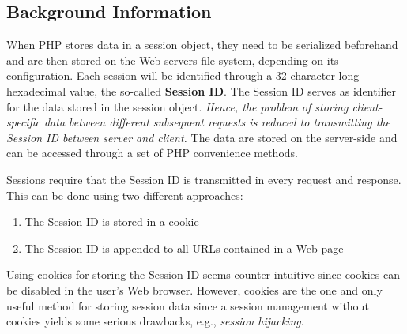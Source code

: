\documentclass[a4paper, justified, notoc]{tufte-handout} %
\begin{document}
\subsection{Background Information} %
\label{sub:background_information}

When PHP stores data in a session object, they need to be serialized beforehand and are then stored on the Web servers file system, depending on its configuration. 
Each  session will be identified through a 32-character long hexadecimal value, the so-called \textbf{Session ID}.
The Session ID serves as identifier for the data stored in the session object. 
\emph{Hence, the problem of storing client-specific data between different subsequent requests is reduced to transmitting the Session ID between server and client. }
The data are stored on the server-side and can be accessed through a set of PHP convenience methods. 

Sessions require that the Session ID is transmitted in every request and response.
This can be done using two different approaches:
\begin{enumerate}
	\item The Session ID is stored in a cookie
	\item The Session ID is appended to all URLs contained in a Web page
\end{enumerate}

Using cookies for storing the Session ID seems counter intuitive since cookies can be disabled in the user's Web browser. However, cookies are the one and only useful method for storing session data since a session management without cookies yields some serious drawbacks, e.g., \emph{session hijacking}.
\end{document}

